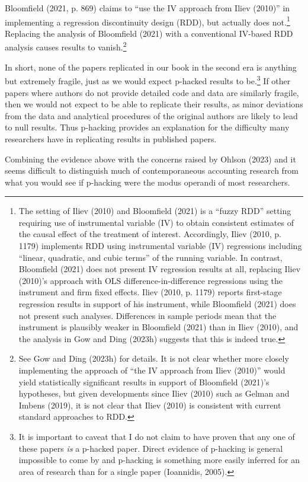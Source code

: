 \documentclass[
  letterpaper,
  DIV=11,
  numbers=noendperiod]{scrartcl}
\begin{document}
Bloomfield (2021, p. 869) claims to ``use the IV approach from Iliev
(2010)'' in implementing a regression discontinuity design (RDD), but
actually does not.\footnote{The setting of Iliev (2010) and Bloomfield
  (2021) is a ``fuzzy RDD'' setting requiring use of instrumental
  variable (IV) to obtain consistent estimates of the causal effect of
  the treatment of interest. Accordingly, Iliev (2010, p. 1179)
  implements RDD using instrumental variable (IV) regressions including
  ``linear, quadratic, and cubic terms'' of the running variable. In
  contrast, Bloomfield (2021) does not present IV regression results at
  all, replacing Iliev (2010)'s approach with OLS
  difference-in-difference regressions using the instrument and firm
  fixed effects. Iliev (2010, p. 1179) reports first-stage regression
  results in support of his instrument, while Bloomfield (2021) does not
  present such analyses. Differences in sample periods mean that the
  instrument is plausibly weaker in Bloomfield (2021) than in Iliev
  (2010), and the analysis in Gow and Ding (2023h) suggests that this is
  indeed true.} Replacing the analysis of Bloomfield (2021) with a
conventional IV-based RDD analysis causes results to vanish.\footnote{See
  Gow and Ding (2023h) for details. It is not clear whether more closely
  implementing the approach of ``the IV approach from Iliev (2010)''
  would yield statistically significant results in support of Bloomfield
  (2021)'s hypotheses, but given developments since Iliev (2010) such as
  Gelman and Imbens (2019), it is not clear that Iliev (2010) is
  consistent with current standard approaches to RDD.}

In short, none of the papers replicated in our book in the second era is
anything but extremely fragile, just as we would expect p-hacked results
to be.\footnote{It is important to caveat that I do not claim to have
  proven that any one of these papers \emph{is} a p-hacked paper. Direct
  evidence of p-hacking is general impossible to come by and p-hacking
  is something more easily inferred for an area of research than for a
  single paper (Ioannidis, 2005).} If other papers where authors do not
provide detailed code and data are similarly fragile, then we would not
expect to be able to replicate their results, as minor deviations from
the data and analytical procedures of the original authors are likely to
lead to null results. Thus p-hacking provides an explanation for the
difficulty many researchers have in replicating results in published
papers.

Combining the evidence above with the concerns raised by Ohlson (2023)
and it seems difficult to distinguish much of contemporaneous accounting
research from what you would see if p-hacking were the modus operandi of
most researchers.
\end{document}
